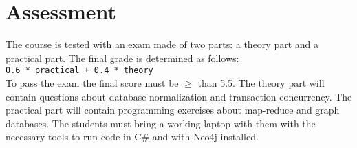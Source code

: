 \section{Assessment}

The course is tested with an exam made of two parts: a theory part and a practical part. The final grade is determined as follows:\\

\texttt{0.6 * practical + 0.4 * theory}\\

To pass the exam the final score must be $\geq$ than 5.5.
The theory part will contain questions about 
database normalization and transaction concurrency. The practical part will contain programming
exercises about map-reduce and graph databases. The students must bring a working laptop with them
with the necessary tools to run code in C\# and with Neo4j installed.

